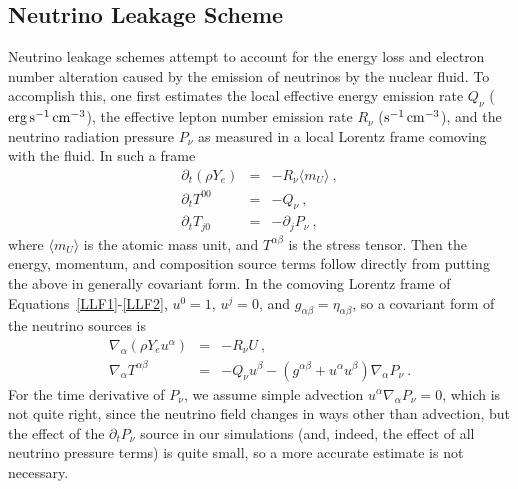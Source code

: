 \subsection{Neutrino Leakage Scheme}
\label{sec:leakage}
Neutrino leakage schemes attempt to account for
the energy loss and electron number alteration caused
by the emission of neutrinos by the nuclear fluid.  To accomplish this, one
first estimates the local effective energy emission rate
$Q_{\nu}$ ($\rm erg\,s^{-1}\,cm^{-3}$), the effective lepton number
emission rate $R_{\nu}$ ($\rm s^{-1}\,cm^{-3}$), and the neutrino
radiation pressure $P_{\nu}$ as measured in a local
Lorentz frame comoving with the fluid.  In such a frame
\begin{eqnarray}
\label{LLF1}
\partial_t (\rho Y_e) &=& -R_{\nu}\langle m_U \rangle\ , \\
\partial_t T^{00} &=& -Q_{\nu}\ , \\
\label{LLF2}
\partial_t T_{j0} &=& -\partial_j P_{\nu}\ ,
\end{eqnarray}
where $\langle m_U \rangle$ is the atomic mass unit,
and $T^{\alpha\beta}$ is the stress tensor.
Then the energy,
momentum, and composition source terms
follow directly from putting the above in generally
covariant form.  In the comoving Lorentz frame of
Equations~\ref{LLF1}-\ref{LLF2}, $u^0=1$, $u^j=0$,
and $g_{\alpha\beta}=\eta_{\alpha\beta}$,
so a covariant form of the neutrino sources is
\begin{eqnarray}
  \nabla_{\alpha}(\rho Y_e u^{\alpha}) &=& -R_{\nu}U\ , \\
  \nabla_{\alpha}T^{\alpha\beta} &=& -Q_{\nu}u^{\beta}
  - (g^{\alpha\beta}+u^{\alpha}u^{\beta})\nabla_{\alpha}P_{\nu}\ .
\end{eqnarray}
For the time derivative of $P_{\nu}$, we assume simple
advection $u^{\alpha}\nabla_{\alpha}P_{\nu}=0$, which is
not quite right, since the neutrino field changes in ways other
than advection, but the effect of the $\partial_tP_{\nu}$
source in our simulations (and, indeed, the effect of all neutrino
pressure terms) is quite small, so a more accurate
estimate is not necessary.

